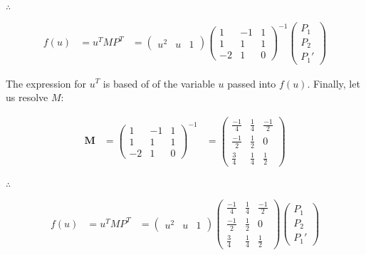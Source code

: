 \documentclass[12pt]{article}
\begin{document}
$\therefore$

\begin{align}
f(u) 
&=
u^{T}MP^{T}
&=
\begin{pmatrix}
u^2 & u & 1
\end{pmatrix} \nonumber
\begin{pmatrix}
1 & -1 & 1 \\
1 & 1 & 1 \\
-2 & 1 & 0  
\end{pmatrix}^{-1}
\begin{pmatrix}
P_1 \\
P_2 \\
P_1'
\end{pmatrix} \nonumber
\end{align}

The expression for $u^T$ is based of of the variable $u$ passed into $f(u)$.
Finally, let us resolve $M$:

\begin{align}
\textbf{M} &=
\begin{pmatrix}
1 & -1 & 1 \\
1 & 1 & 1 \\
-2 & 1 & 0  
\end{pmatrix}^{-1}
&=
\begin{pmatrix}
{\frac{-1}{4}} & {\frac{1}{4}} & {\frac{-1}{2}} \\
{\frac{-1}{2}} & {\frac{1}{2}} & 0 \\
{\frac{3}{4}} & {\frac{1}{4}} & {\frac{1}{2}}  
\end{pmatrix} \nonumber \\
\end{align}

$\therefore$

\begin{align}
f(u) 
&=
u^{T}MP^{T}
&=
\begin{pmatrix}
u^2 & u & 1
\end{pmatrix} \nonumber
\begin{pmatrix}
{\frac{-1}{4}} & {\frac{1}{4}} & {\frac{-1}{2}} \\
{\frac{-1}{2}} & {\frac{1}{2}} & 0 \\
{\frac{3}{4}} & {\frac{1}{4}} & {\frac{1}{2}}  
\end{pmatrix} \nonumber
\begin{pmatrix}
P_1 \\
P_2 \\
P_1'
\end{pmatrix} \nonumber
\end{align}
\end{document}
